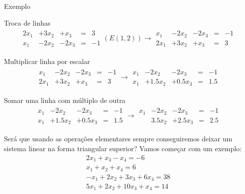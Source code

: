 \documentclass{beamer}
\begin{document}
\begin{frame}{Exemplo}
\begin{block}{Troca de linhas}
  \begin{gather*}
    \begin{array}{ccccc}
      2x_1 & + 3x_2& + x_3& =& 3 \\
      x_1 & -2x_2 &-2x_3&=& -1
    \end{array} (E(1,2)) \rightarrow \begin{array}{ccccc}
      x_1 & -2x_2 &-2x_3&=& -1 \\
      2x_1 & + 3x_2& + x_3& =& 3 
    \end{array} 
  \end{gather*}
\end{block}

\begin{block}{Multiplicar linha por escalar}
  \begin{gather*}
    \begin{array}{ccccc}
      x_1 & -2x_2 &-2x_3&=& -1 \\
      2x_1 & + 3x_2& + x_3& =& 3 
    \end{array} \rightarrow \begin{array}{ccccc}
      x_1 & -2x_2& -2x_3& =& -1 \\
      x_1 & +1.5x_2 &+0.5x_3&=& 1.5
    \end{array}  
  \end{gather*}
\end{block}

\begin{block}{Somar uma linha com múltiplo de outra}
  \begin{gather*}
    \begin{array}{ccccc}
      x_1 & -2x_2& -2x_3& =& -1 \\
      x_1 & +1.5x_2 &+0.5x_3&=& 1.5
    \end{array}  \rightarrow
    \begin{array}{ccccc}
      x_1 & -2x_2& -2x_3& =& -1 \\
          & 3.5x_2 &+2.5x_3&=& 2.5
    \end{array}  
  \end{gather*}
\end{block}
\end{frame}


\begin{frame} 
  Será que usando as operações elementares sempre conseguiremos
  deixar um sistema linear na forma triangular superior?
  Vamos começar com um exemplo:
  \begin{gather*}
    2x_1 + x_3 -x_4 = -6\\
    x_1 + x_2 + x_4 = 6 \\
    -x_1 +2x_2+3x_3+6x_4=38 \\
    5x_1 + 2x_2 + 10x_3 +x_4 =14
  \end{gather*}




\end{frame}
\end{document}
